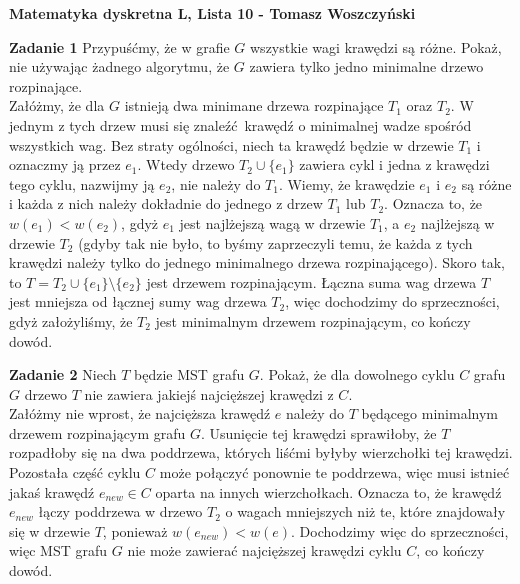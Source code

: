 \documentclass[a4paper,12pt]{article}
\begin{document}
\noindent \textbf{Matematyka dyskretna L, Lista 10 - Tomasz Woszczyński}\newline

\noindent \newline \textbf{Zadanie 1} \newline
Przypuśćmy, że w grafie $G$ wszystkie wagi krawędzi są różne. Pokaż, nie używając
żadnego algorytmu, że $G$ zawiera tylko jedno minimalne drzewo rozpinające. \\

\noindent Załóżmy, że dla $G$ istnieją dwa minimane drzewa rozpinające $T_1$
oraz $T_2$. W jednym z tych drzew musi się znaleźć krawędź o minimalnej wadze
spośród wszystkich wag. Bez straty ogólności, niech ta krawędź będzie w drzewie
$T_1$ i oznaczmy ją przez $e_1$. Wtedy drzewo $T_2 \cup \{ e_1 \}$ zawiera cykl 
i jedna z krawędzi tego cyklu, nazwijmy ją $e_2$, nie należy do $T_1$. Wiemy, że 
krawędzie $e_1$ i $e_2$ są różne i każda z nich należy dokładnie do jednego 
z drzew $T_1$ lub $T_2$. Oznacza to, że $w(e_1) < w(e_2)$, gdyż $e_1$ jest
najlżejszą wagą w drzewie $T_1$, a $e_2$ najlżejszą w drzewie $T_2$ (gdyby tak
nie było, to byśmy zaprzeczyli temu, że każda z tych krawędzi należy tylko
do jednego minimalnego drzewa rozpinającego). Skoro tak, to 
$T = T_2 \cup \{ e_1 \} \setminus \{ e_2 \}$ jest drzewem rozpinającym. Łączna
suma wag drzewa $T$ jest mniejsza od łącznej sumy wag drzewa $T_2$, więc 
dochodzimy do sprzeczności, gdyż założyliśmy, że $T_2$ jest minimalnym
drzewem rozpinającym, co kończy dowód.

\noindent \newline \textbf{Zadanie 2} \newline
Niech $T$ będzie MST grafu $G$. Pokaż, że dla dowolnego cyklu $C$ grafu $G$
drzewo $T$ nie zawiera jakiejś najcięższej krawędzi z $C$. \\

\noindent Załóżmy nie wprost, że najcięższa krawędź $e$ należy do $T$ będącego
minimalnym drzewem rozpinającym grafu $G$. Usunięcie tej krawędzi sprawiłoby,
że $T$ rozpadłoby się na dwa poddrzewa, których liśćmi byłyby wierzchołki 
tej krawędzi. Pozostała część cyklu $C$ może połączyć ponownie te poddrzewa,
więc musi istnieć jakaś krawędź $e_{new} \in C$ oparta na innych wierzchołkach. 
Oznacza to, że krawędź $e_{new}$ łączy poddrzewa w drzewo $T_2$ o wagach 
mniejszych niż te, które znajdowały się w drzewie $T$, ponieważ 
$w(e_{new}) < w(e)$. Dochodzimy więc do sprzeczności, więc MST grafu $G$ nie
może zawierać najcięższej krawędzi cyklu $C$, co kończy dowód.
\end{document}
